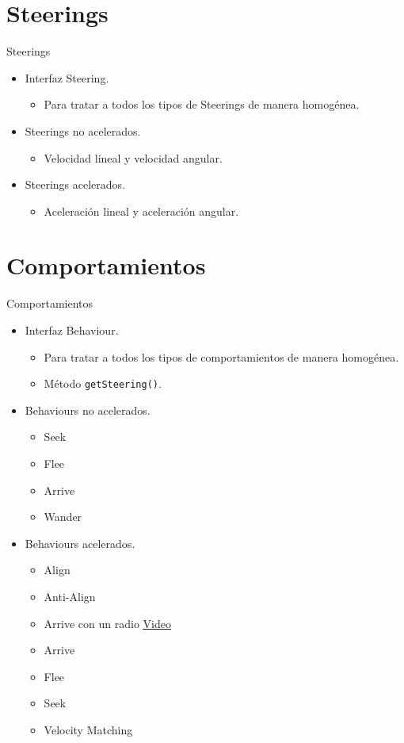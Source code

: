 \documentclass[10pt]{beamer}
\begin{document}
\section{Steerings}
\begin{frame}{Steerings}
\begin{itemize}[<+- | alert@+>]
	\item Interfaz Steering.
	\begin{itemize}[<+- | alert@+>]
  		\item Para tratar a todos los tipos de Steerings de manera homogénea.
 	\end{itemize}
 	\item Steerings no acelerados.
 	\begin{itemize}[<+- | alert@+>]
  		\item Velocidad lineal y velocidad angular.
 	\end{itemize}
 	\item Steerings acelerados.
 	\begin{itemize}[<+- | alert@+>]
  		\item Aceleración lineal y aceleración angular.
 	\end{itemize}
\end{itemize}
\end{frame}

\section{Comportamientos}
\begin{frame}{Comportamientos}
\begin{itemize}[<+- | alert@+>]
	\item Interfaz Behaviour.
	\begin{itemize}[<+- | alert@+>]
  		\item Para tratar a todos los tipos de comportamientos de manera homogénea.
  		\item Método \texttt{getSteering()}.
 	\end{itemize}
 	\item Behaviours no acelerados.
 	\begin{itemize}[<+- | alert@+>]
  		\item Seek \item Flee \item Arrive \item Wander 
 	\end{itemize}
 	\item Behaviours acelerados.
 	\begin{itemize}[<+- | alert@+>]
  		\item Align \item Anti-Align \item Arrive con un radio \href{videos/TestArrive\_Accelerated\_WithOneRadious.mp4}{\color{blue}\underline{Video}}
  		\item Arrive \item Flee \item Seek \item Velocity Matching
 	\end{itemize}
\end{itemize}
\end{frame}
\end{document}
